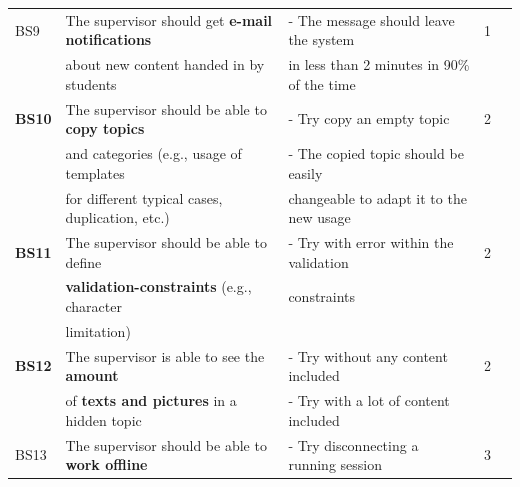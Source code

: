 {\begin{landscape}
\begin{center}
\begin{longtable}{|l|l|lll|}
	\hline
	BS9 	& The supervisor should get \textbf{e-mail notifications} 	& - The message should leave the system  & 1\\
		& about new content handed in by students		& in less than 2 minutes in 90\% of the time	& \\
	\hline
	\textbf{BS10}& The supervisor should be able to \textbf{copy topics} 		& - Try copy an empty topic  		& 2\\
		& and categories (e.g., usage of templates				& - The copied topic should be easily		&		\\
		& for different typical cases, duplication, etc.)				& changeable to adapt it to the new usage		& \\
	\hline
	\textbf{BS11}& The supervisor should be able to define 				& - Try with error within the validation & 2\\
		& \textbf{validation-constraints} (e.g., character			& constraints & \\
		& limitation)										& 			& \\
	\hline
	\textbf{BS12}& The supervisor is able to see the \textbf{amount}		& - Try without any content included & 2\\
		& of \textbf{texts and pictures} in a hidden topic			& - Try with a lot of content included	& \\
	\hline
	BS13& The supervisor should be able to \textbf{work offline} 	& - Try disconnecting a running session & 3\\
\end{longtable}
\end{center} 
    \end{landscape}
    \clearpage%
}

